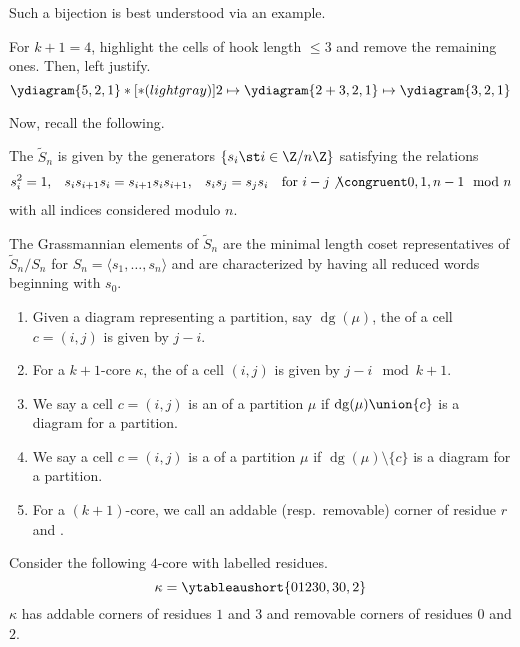 \documentclass[11pt,leqno,oneside]{amsart}
\numberwithin{thm}{section}
\newcommand{\eS}{\tilde{S}}
\DeclareMathOperator{\dg}{dg}
\begin{document}
Such a bijection is best understood via an example.
\begin{example}
  For \(k+1=4\), highlight the cells of hook length \(\leq 3\) and
  remove the remaining ones. Then, left justify.
  \[
    \ydiagram{5,2,1}*[*(lightgray)]{2} \mapsto
    \ydiagram{2+3,2,1} \mapsto \ydiagram{3,2,1}
  \]
\end{example}
Now, recall the following.
\begin{defn}
  The  \(\eS_n\) is given by the generators
  \(\{s_i \st i \in \Z/n\Z\}\) satisfying the relations
  \begin{align*}
    s_i^2 & = 1, & s_i s_{i+1} s_i & = s_{i+1} s_i s_{i+1}, & s_i s_j
    & = s_j s_i & \text{for }i-j \not\congruent 0,1,n-1 \mod n
  \end{align*}
  with all indices considered modulo \(n\).
\end{defn}
\begin{prop}
  The Grassmannian elements of \(\eS_n\) are the minimal length coset
  representatives of \(\eS_n / S_n\) for \(S_n = \langle s_1, \ldots,
  s_n \rangle\) and are characterized by having all reduced words
  beginning with \(s_0\).
\end{prop}
\begin{defn}
  \begin{enumerate}
  \item Given a diagram representing a partition, say \(\dg(\mu)\), the  of
    a cell \(c = (i,j)\) is given by \(j-i\). 
  \item For a \(k+1\)-core
    \(\kappa\), the  of a cell \((i,j)\) is given by
    \(j-i \mod k+1\).
  \item We say a cell \(c = (i,j)\) is an  of a
    partition \(\mu\) if \(\dg(\mu) \union \{c\}\) is a diagram for a partition.
  \item We say a cell \(c = (i,j)\) is a  of a
    partition \(\mu\) if \(\dg(\mu) \setminus \{c\}\) is a diagram for
    a partition.
  \item For a \((k+1)\)-core, we call an addable (resp.\ removable)
    corner of residue \(r\) and .
  \end{enumerate}
\end{defn}
\begin{example}
  Consider the following \(4\)-core with labelled residues. \[
    \kappa = \ytableaushort{01230,30,2}
  \]
  \(\kappa\) has addable corners of residues \(1\) and \(3\) and
  removable corners of residues \(0\) and \(2\).
\end{example}
\end{document}

